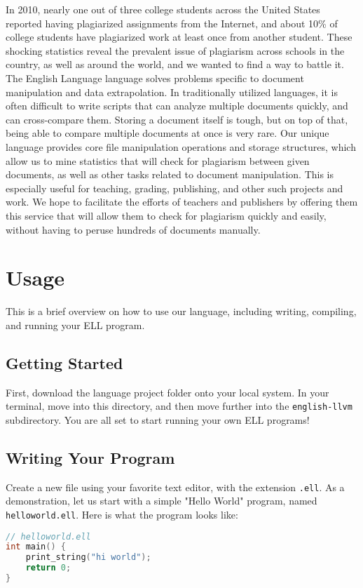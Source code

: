 \documentclass{article}
\begin{document}
In 2010, nearly one out of three college students across the United States reported having plagiarized assignments from the Internet, and about 10\% of college students have plagiarized work at least once from another student. These shocking statistics reveal the prevalent issue of plagiarism across schools in the country, as well as around the world, and we wanted to find a way to battle it. 
\newline \newline
The English Language language solves problems specific to document manipulation and data extrapolation. In traditionally utilized languages, it is often difficult to write scripts that can analyze multiple documents quickly, and can cross-compare them. Storing a document itself is tough, but on top of that, being able to compare multiple documents at once is very rare. Our unique language provides core file manipulation operations and storage structures, which allow us to mine statistics that will check for plagiarism between given documents, as well as other tasks related to document manipulation. This is especially useful for teaching, grading, publishing, and other such projects and work. We hope to facilitate the efforts of teachers and publishers by offering them this service that will allow them to check for plagiarism quickly and easily, without having to peruse hundreds of documents manually.


\newpage
\section{Usage}
This is a brief overview on how to use our language, including writing, compiling, and running your ELL program. \newline

\subsection{Getting Started}
First, download the language project folder onto your local system. In your terminal, move into this directory, and then move further into the {\ttfamily\texttt{english-llvm}} subdirectory. You are all set to start running your own ELL programs!

\subsection{Writing Your Program}
Create a new file using your favorite text editor, with the extension {\ttfamily\texttt{.ell}}. As a demonstration, let us start with a simple "Hello World" program, named {\ttfamily\texttt{helloworld.ell}}. Here is what the program looks like: \newline
\begin{lstlisting}[language=C]
// helloworld.ell
int main() {
    print_string("hi world");
    return 0;
}
\end{lstlisting}
\end{document}
